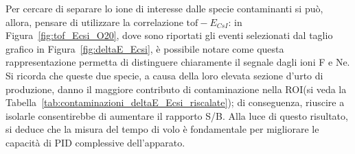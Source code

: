 Per cercare di separare lo ione di interesse dalle specie contaminanti si può, allora, pensare di utilizzare la correlazione $\mbox{tof} - E_{CsI}$: in Figura~\ref{fig:tof_Ecsi_O20}, dove sono riportati gli eventi selezionati dal taglio grafico in Figura~\ref{fig:deltaE_Ecsi}, è possibile notare come questa rappresentazione permetta di distinguere chiaramente il segnale dagli ioni F e Ne.
Si ricorda che queste due specie, a causa della loro elevata sezione d'urto di produzione, danno il maggiore contributo di contaminazione nella ROI(si veda la Tabella~\ref{tab:contaminazioni_deltaE_Ecsi_riscalate}); di conseguenza, riuscire a isolarle consentirebbe di aumentare il rapporto S/B.
Alla luce di questo risultato, si deduce che la misura del tempo di volo è fondamentale per migliorare le capacità di PID complessive dell'apparato.







\subsection{}

